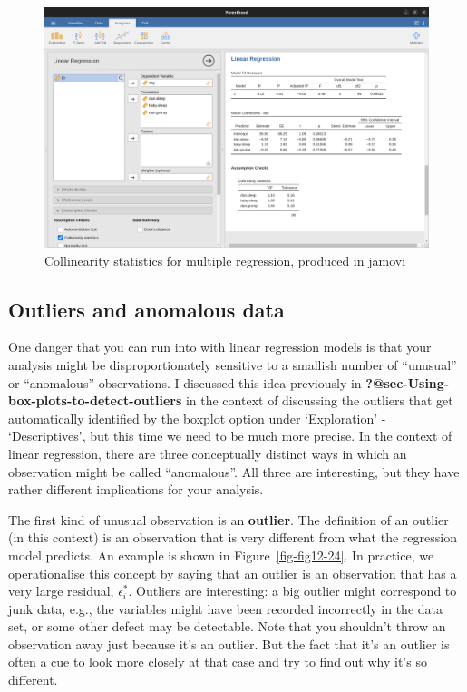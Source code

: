 \documentclass[
  a4paper,
]{book}
\begin{document}
\begin{figure}

\includegraphics[width=1\textwidth,height=\textheight]{images/fig12-23.png} \hfill{}

\caption{\label{fig-fig12-23}Collinearity statistics for multiple
regression, produced in jamovi}

\end{figure}

\hypertarget{outliers-and-anomalous-data}{%
\subsection{Outliers and anomalous
data}\label{outliers-and-anomalous-data}}

One danger that you can run into with linear regression models is that
your analysis might be disproportionately sensitive to a smallish number
of ``unusual'' or ``anomalous'' observations. I discussed this idea
previously in \textbf{?@sec-Using-box-plots-to-detect-outliers} in the
context of discussing the outliers that get automatically identified by
the boxplot option under `Exploration' - `Descriptives', but this time
we need to be much more precise. In the context of linear regression,
there are three conceptually distinct ways in which an observation might
be called ``anomalous''. All three are interesting, but they have rather
different implications for your analysis.

The first kind of unusual observation is an \textbf{outlier}. The
definition of an outlier (in this context) is an observation that is
very different from what the regression model predicts. An example is
shown in Figure~\ref{fig-fig12-24}. In practice, we operationalise this
concept by saying that an outlier is an observation that has a very
large residual, \(\epsilon_i^*\). Outliers are interesting: a big
outlier might correspond to junk data, e.g., the variables might have
been recorded incorrectly in the data set, or some other defect may be
detectable. Note that you shouldn't throw an observation away just
because it's an outlier. But the fact that it's an outlier is often a
cue to look more closely at that case and try to find out why it's so
different.
\end{document}
